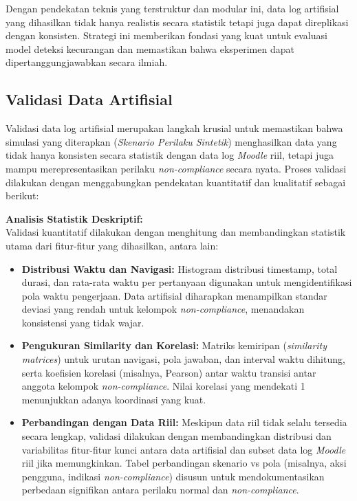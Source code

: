 Dengan pendekatan teknis yang terstruktur dan modular ini, data log artifisial yang dihasilkan tidak hanya realistis secara statistik tetapi juga dapat direplikasi dengan konsisten. Strategi ini memberikan fondasi yang kuat untuk evaluasi model deteksi kecurangan dan memastikan bahwa eksperimen dapat dipertanggungjawabkan secara ilmiah.

\subsection{Validasi Data Artifisial}
\label{sec:validasiDataArtifisial}
Validasi data log artifisial merupakan langkah krusial untuk memastikan bahwa simulasi yang diterapkan (\textit{Skenario Perilaku Sintetik}) menghasilkan data yang tidak hanya konsisten secara statistik dengan data log \textit{Moodle} riil, tetapi juga mampu merepresentasikan perilaku \textit{non-compliance} secara nyata. Proses validasi dilakukan dengan menggabungkan pendekatan kuantitatif dan kualitatif sebagai berikut:

\textbf{Analisis Statistik Deskriptif:} \\
Validasi kuantitatif dilakukan dengan menghitung dan membandingkan statistik utama dari fitur-fitur yang dihasilkan, antara lain:
\begin{itemize}
    \item \textbf{Distribusi Waktu dan Navigasi:} Histogram distribusi timestamp, total durasi, dan rata-rata waktu per pertanyaan digunakan untuk mengidentifikasi pola waktu pengerjaan. Data artifisial diharapkan menampilkan standar deviasi yang rendah untuk kelompok \textit{non-compliance}, menandakan konsistensi yang tidak wajar.
    \item \textbf{Pengukuran Similarity dan Korelasi:} Matriks kemiripan (\textit{similarity matrices}) untuk urutan navigasi, pola jawaban, dan interval waktu dihitung, serta koefisien korelasi (misalnya, Pearson) antar waktu transisi antar anggota kelompok \textit{non-compliance}. Nilai korelasi yang mendekati 1 menunjukkan adanya koordinasi yang kuat.
    \item \textbf{Perbandingan dengan Data Riil:} Meskipun data riil tidak selalu tersedia secara lengkap, validasi dilakukan dengan membandingkan distribusi dan variabilitas fitur-fitur kunci antara data artifisial dan subset data log \textit{Moodle} riil jika memungkinkan. Tabel perbandingan skenario vs pola (misalnya, aksi pengguna, indikasi \textit{non-compliance}) disusun untuk mendokumentasikan perbedaan signifikan antara perilaku normal dan \textit{non-compliance}.
\end{itemize}

